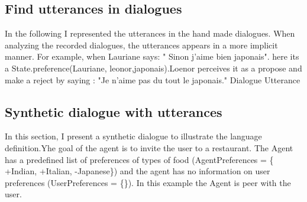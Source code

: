 \documentclass{llncs}
\begin{document}
 \subsection{Find utterances in dialogues}	
 
 In the following I represented the utterances in the hand made dialogues. When analyzing the recorded dialogues, the utterances appears in a more implicit manner. For example, when Lauriane says: " Sinon j'aime bien japonais". here its a State.preference(Lauriane, leonor,japonais).Loenor perceives it as a propose and make a reject by saying : "Je n'aime pas du tout le japonais."
 Dialogue	Utterance

 \subsection{Synthetic dialogue with utterances}
 In this section, I present a synthetic dialogue to illustrate the language definition.Yhe goal of the agent is to invite the user to a restaurant. The Agent has a predefined list of preferences of types of food (AgentPreferences = \{ +Indian, +Italian, -Japanese\}) and the agent has no information on user preferences (UserPreferences = \{\}). In this example the Agent is peer with the user. 
\end{document}
